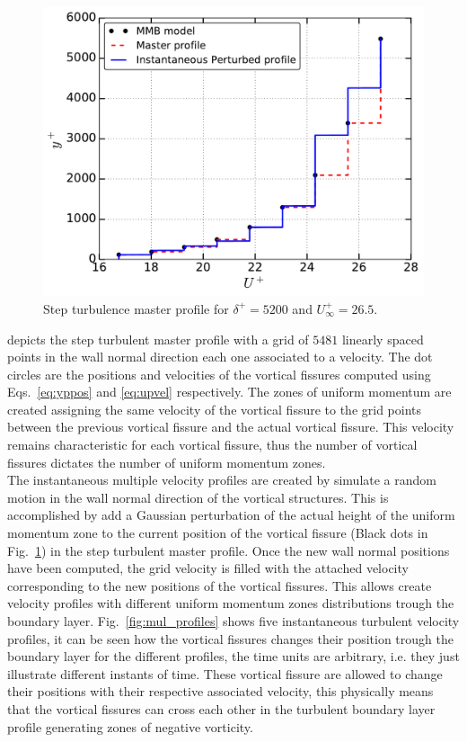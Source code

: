 \documentclass[aps,reprint,amsmath,amssymb,prl]{revtex4-1}%
\begin{document}
\begin{figure}[b]
\includegraphics[scale=0.46]{figures/Master_step_profile}
\caption{\label{fig:master_profile} Step turbulence master profile for $\delta^+=5200$ and $U^+_{\infty}=26.5$.}
\end{figure} 
depicts the step turbulent master profile with a grid of $5481$ linearly spaced points in the wall normal direction each one associated to a velocity. The dot circles are the positions and velocities of the vortical fissures computed using Eqs.~\ref{eq:yppos} and \ref{eq:upvel} respectively. The zones of uniform momentum are created assigning the same velocity of the vortical fissure to the grid points between the previous vortical fissure and the actual vortical fissure. This velocity remains characteristic for each vortical fissure, thus the number of vortical fissures dictates the number of uniform momentum zones. \\
The instantaneous multiple velocity profiles are created by simulate a random motion in the wall normal direction  of the vortical structures. This is accomplished by add a Gaussian perturbation of the actual height of the uniform momentum zone to the current position of the vortical fissure (Black dots in Fig.~\ref{fig:master_profile}) in the step turbulent master profile. Once the new wall normal positions have been computed, the grid velocity is filled with the attached velocity corresponding to the new positions of the vortical fissures. This allows create velocity profiles with different uniform momentum zones distributions trough the boundary layer. Fig.~\ref{fig:mul_profiles} shows five instantaneous turbulent velocity profiles, it can be seen how the vortical fissures changes their position trough the boundary layer for the different profiles, the time units are arbitrary, i.e. they just illustrate different instants of time. These vortical fissure are allowed to change their positions with their respective associated velocity, this physically means that the vortical fissures can cross each other in the turbulent boundary layer  profile generating zones of negative vorticity.
\end{document}

